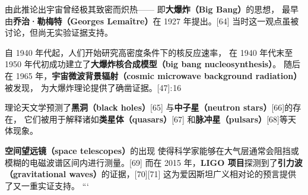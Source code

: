 由此推论出宇宙曾经极其致密而炽热——  
即\textbf{大爆炸（Big Bang）}的思想，  
最早由\textbf{乔治·勒梅特（Georges Lemaître）}在 1927 年提出。[64]  
当时这一观点虽被讨论，但尚无实验证据支持。  

自 1940 年代起，人们开始研究高密度条件下的核反应速率，  
在 1940 年代末至 1950 年代初成功建立了\textbf{大爆炸核合成模型（big bang nucleosynthesis）}。  
随后在 1965 年，\textbf{宇宙微波背景辐射（cosmic microwave background radiation）}被发现，  
为大爆炸理论提供了确凿证据。[47]: 16   

理论天文学预测了\textbf{黑洞（black holes）}[65]  
与\textbf{中子星（neutron stars）}[66]的存在，  
它们被用于解释诸如\textbf{类星体（quasars）}[67]  
和\textbf{脉冲星（pulsars）}[68]等天体现象。  

\textbf{空间望远镜（space telescopes）}的出现  
使得科学家能够在大气层通常会阻挡或模糊的电磁波谱区间内进行测量。[69]  
而在 2015 年，\textbf{LIGO 项目}探测到了\textbf{引力波（gravitational waves）}的证据，[70][71]  
这为爱因斯坦广义相对论的预言提供了又一重实证支持。
```
